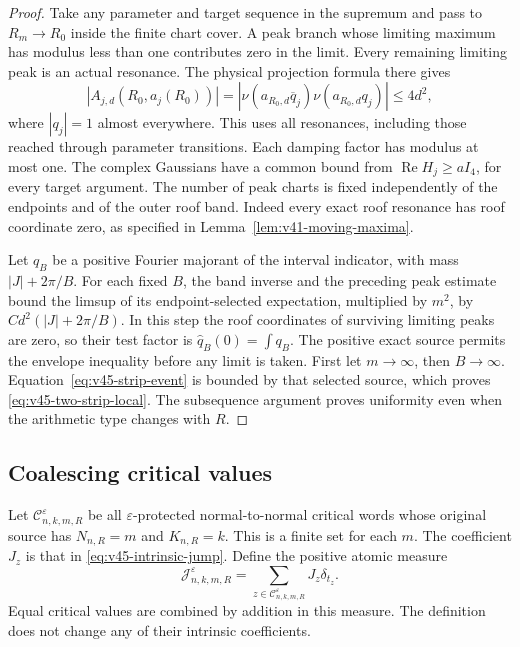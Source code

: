 \begin{proof}
Take any parameter and target sequence in the supremum and pass to
$R_m\to R_0$ inside the finite chart cover. A peak branch whose
limiting maximum has modulus less than one contributes zero in the
limit. Every remaining limiting peak is an actual resonance. The
physical projection formula there gives
\begin{equation}\label{eq:v45-strip-residue-bound}
 |A_{j,d}(R_0,a_j(R_0))|
   =|\nu(a_{R_0,d}\overline q_j)\nu(a_{R_0,d}q_j)|
       \le4d^2,
\end{equation}
where $|q_j|=1$ almost everywhere. This uses all resonances, including
those reached through parameter transitions. Each damping factor has
modulus at most one. The complex Gaussians have a common bound from
$\operatorname{Re}H_j\ge aI_4$, for every target argument. The number
of peak charts is fixed independently of the endpoints and of the
outer roof band. Indeed every exact roof resonance has roof coordinate
zero, as specified in Lemma~\ref{lem:v41-moving-maxima}.

Let $q_B$ be a positive Fourier majorant of the interval indicator,
with mass $|J|+2\pi/B$. For each fixed $B$, the band inverse and the
preceding peak estimate bound the limsup of its endpoint-selected
expectation, multiplied by $m^2$, by $Cd^2(|J|+2\pi/B)$.
In this step the roof coordinates of surviving limiting peaks are
zero, so their test factor is $\widehat q_B(0)=\int q_B$.
The positive exact source permits the envelope inequality before any
limit is taken. First let $m\to\infty$, then $B\to\infty$.
Equation~\eqref{eq:v45-strip-event} is bounded by that selected source,
which proves \eqref{eq:v45-two-strip-local}. The subsequence argument
proves uniformity even when the arithmetic type changes with $R$.
\end{proof}

\subsection{Coalescing critical values}
Let $\mathcal C^\varepsilon_{n,k,m,R}$ be all $\varepsilon$-protected
normal-to-normal critical words whose original source has
$N_{n,R}=m$ and $K_{n,R}=k$. This is a finite set for each $m$.
The coefficient $J_z$ is that in \eqref{eq:v45-intrinsic-jump}.
Define the positive atomic measure
\begin{equation}\label{eq:v45-critical-coefficient-measure}
 \mathcal J^\varepsilon_{n,k,m,R}
                    =\sum_{z\in\mathcal C^\varepsilon_{n,k,m,R}}
                                              J_z\delta_{t_z}.
\end{equation}
Equal critical values are combined by addition in this measure.
The definition does not change any of their intrinsic coefficients.

